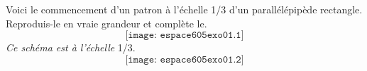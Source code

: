Voici le commencement d'un patron à l'échelle 1/3 d'un parallélépipède rectangle. Reproduis-le en vraie grandeur et complète le.
\[\texttt{[image: espace605exo01.1]}\]
{\em Ce schéma est à l'échelle} 1/3.
\[\texttt{[image: espace605exo01.2]}\]